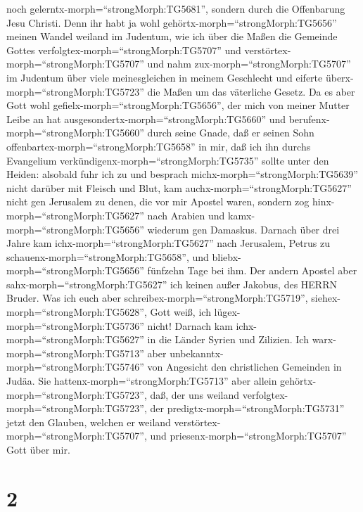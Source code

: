 noch gelerntx-morph=``strongMorph:TG5681'', sondern durch die
Offenbarung Jesu Christi.  Denn ihr habt ja wohl
gehörtx-morph=``strongMorph:TG5656'' meinen Wandel weiland im Judentum,
wie ich über die Maßen die Gemeinde Gottes
verfolgtex-morph=``strongMorph:TG5707'' und
verstörtex-morph=``strongMorph:TG5707''  und nahm
zux-morph=``strongMorph:TG5707'' im Judentum über viele meinesgleichen
in meinem Geschlecht und eiferte überx-morph=``strongMorph:TG5723'' die
Maßen um das väterliche Gesetz.  Da es aber Gott wohl
gefielx-morph=``strongMorph:TG5656'', der mich von meiner Mutter Leibe
an hat ausgesondertx-morph=``strongMorph:TG5660'' und
berufenx-morph=``strongMorph:TG5660'' durch seine Gnade, 
daß er seinen Sohn offenbartex-morph=``strongMorph:TG5658'' in mir, daß
ich ihn durchs Evangelium verkündigenx-morph=``strongMorph:TG5735''
sollte unter den Heiden: alsobald fuhr ich zu und besprach
michx-morph=``strongMorph:TG5639'' nicht darüber mit Fleisch und Blut,
 kam auchx-morph=``strongMorph:TG5627'' nicht gen Jerusalem
zu denen, die vor mir Apostel waren, sondern zog
hinx-morph=``strongMorph:TG5627'' nach Arabien und
kamx-morph=``strongMorph:TG5656'' wiederum gen Damaskus. 
Darnach über drei Jahre kam ichx-morph=``strongMorph:TG5627'' nach
Jerusalem, Petrus zu schauenx-morph=``strongMorph:TG5658'', und
bliebx-morph=``strongMorph:TG5656'' fünfzehn Tage bei ihm. 
Der andern Apostel aber sahx-morph=``strongMorph:TG5627'' ich keinen
außer Jakobus, des HERRN Bruder.  Was ich euch aber
schreibex-morph=``strongMorph:TG5719'',
siehex-morph=``strongMorph:TG5628'', Gott weiß, ich
lügex-morph=``strongMorph:TG5736'' nicht!  Darnach kam
ichx-morph=``strongMorph:TG5627'' in die Länder Syrien und Zilizien.
 Ich warx-morph=``strongMorph:TG5713'' aber
unbekanntx-morph=``strongMorph:TG5746'' von Angesicht den christlichen
Gemeinden in Judäa.  Sie
hattenx-morph=``strongMorph:TG5713'' aber allein
gehörtx-morph=``strongMorph:TG5723'', daß, der uns weiland
verfolgtex-morph=``strongMorph:TG5723'', der
predigtx-morph=``strongMorph:TG5731'' jetzt den Glauben, welchen er
weiland verstörtex-morph=``strongMorph:TG5707'',  und
priesenx-morph=``strongMorph:TG5707'' Gott über mir.

\hypertarget{section-1}{%
\section{2}\label{section-1}}

